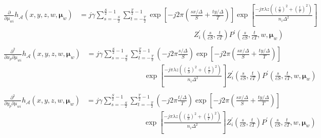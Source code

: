 \documentclass[letter, 11pt]{article}
\begin{document}
\begin{align*}
	\begin{split}
		\frac{\partial}{\partial \mu_{wi}} h_{\mathcal{A}} (x, y, z, w, \boldsymbol{\mu}_{w}) &= 
		j \gamma \sum\limits_{s = - \frac{S}{2} }^{\frac{S}{2} - 1} \sum\limits_{t = - \frac{T}{2} }^{\frac{T}{2} - 1}  
		\exp \left[ - j 2 \pi \left( \frac{s x / \Delta}{S} + \frac{t y / \Delta }{T} \right) \right] \exp 
		\left[ \frac{- j \pi \lambda z ( { \left( \frac{s}{S} \right) }^{2} + {\left( \frac{t}{T} \right)}^{2} ) }
		{n_{i} \Delta^2 } \right] \\
		&\qquad \qquad \qquad \qquad \qquad \qquad \qquad \qquad 
		Z_i^{\prime} {\left( \frac{s}{cS}, \frac{t}{cT} \right)} 
		P^{\prime} {\left( \frac{s}{cS}, \frac{t}{cT}, w, \boldsymbol{\mu}_{w} \right)} 
	\end{split} \\
	\begin{split}
		\frac{\partial^{2}}{\partial x_{p} \partial \mu_{wi}} h_{\mathcal{A}} (x, y, z, w, \boldsymbol{\mu}_{w}) &=
		j \gamma \sum\limits_{s = - \frac{S}{2} }^{\frac{S}{2} - 1} \sum\limits_{t = - \frac{T}{2} }^{\frac{T}{2} - 1} 
		\left( - j 2 \pi \frac{s / \Delta}{S} \right) \exp \left[ - j 2 \pi \left( \frac{s x / \Delta}{S} + \frac{t y / \Delta }{T} \right) \right]  \\
		&\qquad \qquad \qquad \qquad 
		\exp \left[ \frac{- j \pi \lambda z ( { \left( \frac{s}{S} \right) }^2 + {\left( \frac{t}{T} \right)}^2 ) }
		{ n_{i} \Delta^2 } \right]
		Z_i^{\prime} {\left( \frac{s}{cS}, \frac{t}{cT} \right)} P^{\prime} {\left( \frac{s}{cS}, \frac{t}{cT}, w, \boldsymbol{\mu}_{w} \right)}
	\end{split} \\
	\begin{split}
		\frac{\partial^{2}}{\partial y_{p} \partial \mu_{wi}} h_{\mathcal{A}} (x, y, z, w, \boldsymbol{\mu}_{w}) &= 
		j \gamma \sum\limits_{s = - \frac{S}{2} }^{\frac{S}{2} - 1} \sum\limits_{t = - \frac{T}{2} }^{\frac{T}{2} - 1} 
		\left( - j 2 \pi \frac{t / \Delta}{T} \right) \exp \left[ - j 2 \pi \left( \frac{s x / \Delta}{S} + 
		\frac{t y / \Delta }{T} \right) \right]  \\
		&\qquad \qquad \qquad \qquad 
		\exp \left[ \frac{- j \pi \lambda z ( { \left( \frac{s}{S} \right) }^{2} + 
		{\left( \frac{t}{T} \right)}^2 ) }{ n_{i} \Delta^2 } \right]
		Z_i^{\prime} {\left( \frac{s}{cS}, \frac{t}{cT} \right)} P^{\prime} {\left( \frac{s}{cS}, \frac{t}{cT}, w, \boldsymbol{\mu}_{w} \right)}
    \end{split} \\

\end{align*}
\end{document}
